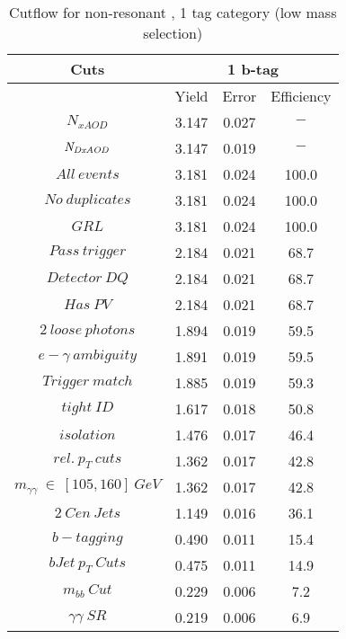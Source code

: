 \begin{table}\footnotesize
\begin{center} 
\caption{Cutflow for non-resonant \hhyybb, 1 tag category (low mass selection)}
\label{tab:cutflow-nonres-1tag-low}
\begin{tabular}{|c|c|c|c|} 
 \hline 
Cuts& \multicolumn{3}{c|}{1 b-tag} \\ \hline 
 &Yield&Error&Efficiency\\ \hline 
$N_{xAOD}$ & 3.147&0.027 &$-$ \\ 
 \hline 
$\it{N}_{DxAOD}$ & 3.147&0.019 &$-$ \\ 
 \hline 
$All\ events$ & 3.181&0.024 &100.0 \\ 
 \hline 
$No\ duplicates$ & 3.181&0.024 &100.0 \\ 
 \hline 
$GRL$ & 3.181&0.024 &100.0 \\ 
 \hline 
$Pass\ trigger$ & 2.184&0.021 &68.7 \\ 
 \hline 
$Detector\ DQ$ & 2.184&0.021 &68.7 \\ 
 \hline 
$Has\ PV$ & 2.184&0.021 &68.7 \\ 
 \hline 
$2\ loose\ photons$ & 1.894&0.019 &59.5 \\ 
 \hline 
$e-\gamma\ ambiguity$ & 1.891&0.019 &59.5 \\ 
 \hline 
$Trigger\ match$ & 1.885&0.019 &59.3 \\ 
 \hline 
$tight\ ID$ & 1.617&0.018 &50.8 \\ 
 \hline 
$isolation$ & 1.476&0.017 &46.4 \\ 
 \hline 
$rel.\ p_{T}\ cuts$ & 1.362&0.017 &42.8 \\ 
 \hline 
$m_{\gamma\gamma}\ \in\ [105,160]\ GeV$ & 1.362&0.017 &42.8 \\ 
 \hline 
$2\ Cen\ Jets$ & 1.149&0.016 &36.1 \\ 
 \hline 
$b-tagging$ & 0.490&0.011 &15.4 \\ 
 \hline 
$bJet\ p_{T}\ Cuts$ & 0.475&0.011 &14.9 \\ 
 \hline 
$m_{bb}\ Cut$ & 0.229&0.006 & 7.2 \\ 
 \hline 
$\gamma\gamma\ SR$ & 0.219&0.006 & 6.9 \\ 
 \hline 
\end{tabular}
\end{center}
\end{table}
